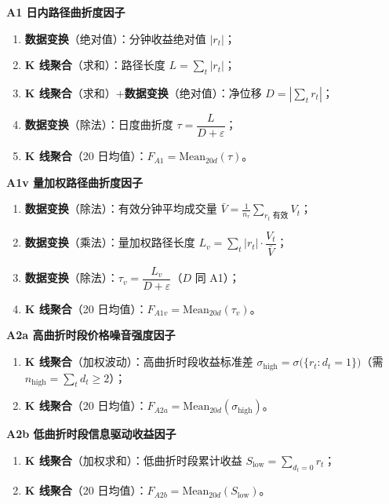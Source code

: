 \documentclass[UTF8,a4paper,zihao=-4,fontset=windows]{ctexart}
\providecommand{\tightlist}{\setlength{\itemsep}{0pt}\setlength{\parskip}{0pt}}
\begin{document}
\textbf{A1 日内路径曲折度因子}

\begin{enumerate}
\def\labelenumi{\arabic{enumi}.}
\tightlist
\item
  \textbf{数据变换}（绝对值）：分钟收益绝对值 \(|r_t|\)；
\item
  \textbf{K 线聚合}（求和）：路径长度 \(L=\sum_t |r_t|\)；
\item
  \textbf{K 线聚合}（求和）+\textbf{数据变换}（绝对值）：净位移
  \(D=\left|\sum_t r_t\right|\)；
\item
  \textbf{数据变换}（除法）：日度曲折度
  \(\tau=\dfrac{L}{D+\varepsilon}\)；
\item
  \textbf{K 线聚合}（20 日均值）：\(F_{A1}=\mathrm{Mean}_{20d}(\tau)\)。
\end{enumerate}

\textbf{A1v 量加权路径曲折度因子}

\begin{enumerate}
\def\labelenumi{\arabic{enumi}.}
\tightlist
\item
  \textbf{数据变换}（除法）：有效分钟平均成交量
  \(\bar V=\frac{1}{n_r}\sum_{r_t\text{ 有效}}V_t\)；
\item
  \textbf{数据变换}（乘法）：量加权路径长度
  \(L_v=\sum_t |r_t|\cdot\dfrac{V_t}{\bar V}\)；
\item
  \textbf{数据变换}（除法）：\(\tau_v=\dfrac{L_v}{D+\varepsilon}\)（\(D\)
  同 A1）；
\item
  \textbf{K 线聚合}（20
  日均值）：\(F_{A1v}=\mathrm{Mean}_{20d}(\tau_v)\)。
\end{enumerate}

\textbf{A2a 高曲折时段价格噪音强度因子}

\begin{enumerate}
\def\labelenumi{\arabic{enumi}.}
\tightlist
\item
  \textbf{K 线聚合}（加权波动）：高曲折时段收益标准差
  \(\sigma_{\mathrm{high}}=\sigma\big(\{r_t:d_t=1\}\big)\)（需
  \(n_{\mathrm{high}}=\sum_t d_t\ge2\)）；
\item
  \textbf{K 线聚合}（20
  日均值）：\(F_{A2a}=\mathrm{Mean}_{20d}(\sigma_{\mathrm{high}})\)。
\end{enumerate}

\textbf{A2b 低曲折时段信息驱动收益因子}

\begin{enumerate}
\def\labelenumi{\arabic{enumi}.}
\tightlist
\item
  \textbf{K 线聚合}（加权求和）：低曲折时段累计收益
  \(S_{\mathrm{low}}=\sum_{d_t=0}r_t\)；
\item
  \textbf{K 线聚合}（20
  日均值）：\(F_{A2b}=\mathrm{Mean}_{20d}(S_{\mathrm{low}})\)。
\end{enumerate}
\end{document}
